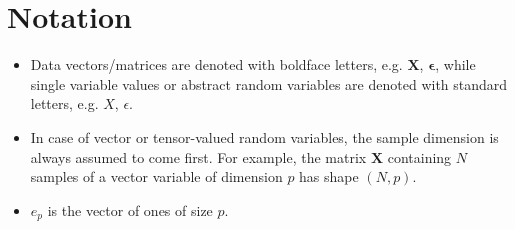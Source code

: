 
\chapter*{Notation} 

\begin{itemize}
    \item Data vectors/matrices are denoted with boldface letters, e.g.
      $\mathbf{X}$, $\bm{\epsilon}$, while single variable values or
      abstract random variables are denoted with standard letters,
      e.g. $X$, $\epsilon$.
    \item In case of vector or tensor-valued
      random variables, the sample dimension is always assumed to come first.
      For example, the matrix $\mathbf{X}$ containing $N$ samples of a
      vector variable of dimension $p$ has shape $(N, p)$.
     \item $e_p$ is the vector of ones of size $p$.
\end{itemize}